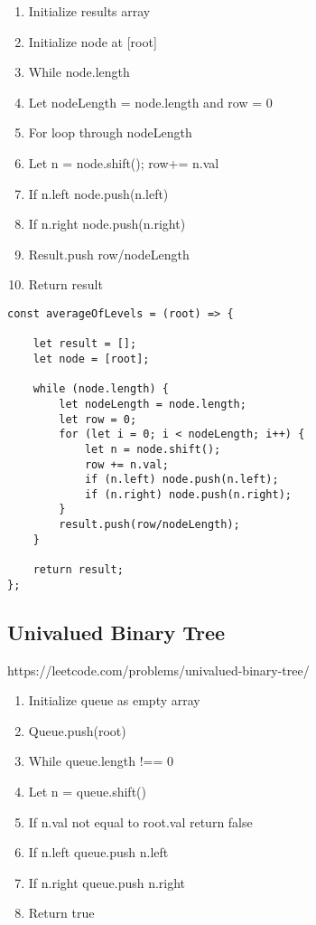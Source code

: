 \documentclass[10pt]{article}
\begin{document}
\begin{enumerate}
	\item Initialize results array 
	\item Initialize node at [root]
	\item While node.length
	\item Let nodeLength = node.length and row = 0
	\item For loop through nodeLength 
	\item Let n = node.shift(); row+= n.val
	\item If n.left node.push(n.left)
	\item If n.right node.push(n.right)
	\item Result.push row/nodeLength
	\item Return result
\end{enumerate}

\begin{lstlisting}[title=Solution averageOfLevels, captionpos=t]
const averageOfLevels = (root) => {
    
    let result = [];
    let node = [root];
    
    while (node.length) {
        let nodeLength = node.length; 
        let row = 0; 
        for (let i = 0; i < nodeLength; i++) {
            let n = node.shift();
            row += n.val;
            if (n.left) node.push(n.left);
            if (n.right) node.push(n.right);
        }
        result.push(row/nodeLength);
    }
    
    return result;
};
\end{lstlisting}

\medskip %











\pagebreak
\medskip   
\subsection {Univalued Binary Tree}
https://leetcode.com/problems/univalued-binary-tree/

\begin{enumerate}
	\item Initialize queue as empty array
	\item Queue.push(root)
	\item While queue.length !== 0
	\item Let n = queue.shift()
	\item If n.val not equal to root.val return false
	\item If n.left queue.push n.left
	\item If n.right queue.push n.right
	\item Return true
\end{enumerate}
\end{document}
